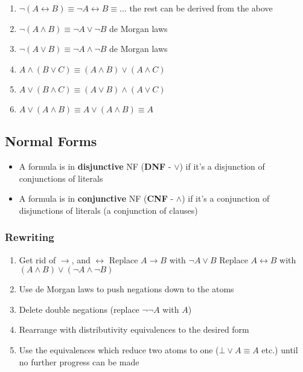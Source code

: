 \documentclass[a4paper, 12pt]{article}
\begin{document}
\begin{enumerate}[1.]
                \item $\neg (A \leftrightarrow B) \equiv \neg A \leftrightarrow B \equiv ...$ \hfill the rest can be derived from the above
                \item $\neg (A \land B) \equiv \neg A \lor \neg B$ \hfill de Morgan laws
                \item $\neg (A \lor B) \equiv \neg A \land \neg B$ \hfill de Morgan laws
                \item $A \land (B \lor C) \equiv (A \land B) \lor (A \land C)$
                \item $A \lor (B \land C) \equiv (A \lor B) \land (A \lor C)$
                \item $A \lor (A \land B) \equiv A \lor (A \land B) \equiv A$
            \end{enumerate}
        \subsection*{Normal Forms}
            \begin{itemize}
                \itemsep0em
                \item A formula is in \textbf{disjunctive} NF (\textbf{DNF} - $\lor$) if it's a disjunction of conjunctions of literals
                \item A formula is in \textbf{conjunctive} NF (\textbf{CNF} - $\land$) if it's a conjunction of disjunctions of literals (a conjunction of clauses)
            \end{itemize}
            \subsubsection*{Rewriting}
                \begin{enumerate}[1.]
                    \itemsep0em
                    \item Get rid of $\rightarrow$, and $\leftrightarrow$
                        \subitem Replace $A \rightarrow B$ with $\neg A \lor B$
                        \subitem Replace $A \leftrightarrow B$ with $(A \land B) \lor (\neg A \land \neg B)$
                    \item Use de Morgan laws to push negations down to the atoms
                    \item Delete double negations (replace $\neg \neg A$ with $A$)
                    \item Rearrange with distributivity equivalences to the desired form
                    \item Use the equivalences which reduce two atoms to one ($\bot \lor A \equiv A$ etc.) until no further progress can be made
                \end{enumerate}
\end{document}

